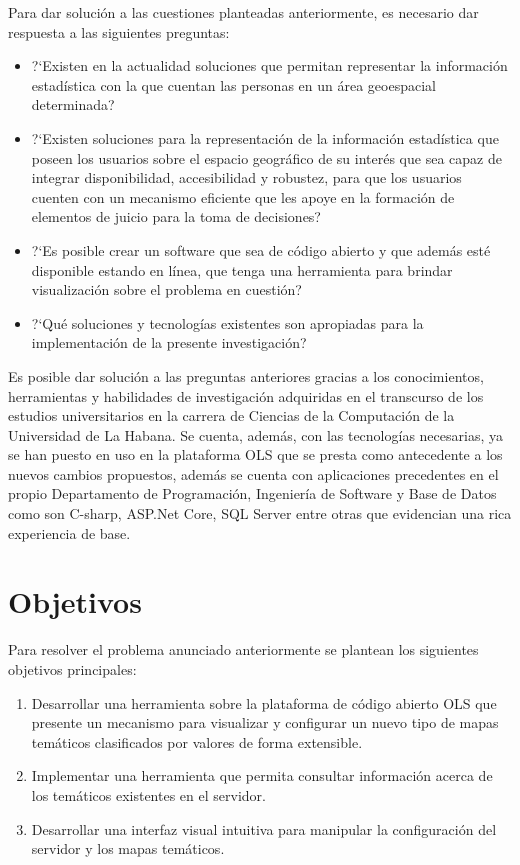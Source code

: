 Para dar soluci\'on a las cuestiones planteadas anteriormente, es necesario dar respuesta a las siguientes preguntas:

\begin{itemize}
\item ?`Existen en la actualidad soluciones que permitan representar la informaci\'on estad\'istica con la que cuentan las personas en un \'area geoespacial determinada?
\item ?`Existen soluciones para la representaci\'on de la informaci\'on estad\'istica que poseen los usuarios sobre el espacio geogr\'afico de su inter\'es que sea capaz de integrar disponibilidad, accesibilidad y robustez, para que los usuarios cuenten
con un mecanismo eficiente que les apoye en la formaci\'on de elementos de juicio para la toma de decisiones?
\item ?`Es posible crear un software que sea de c\'odigo abierto y que adem\'as est\'e disponible estando en l\'inea, que tenga una herramienta para brindar visualizaci\'on sobre el problema en cuesti\'on?
\item ?`Qu\'e soluciones y tecnolog\'ias existentes son apropiadas para la implementaci\'on de la presente investigaci\'on?
\end{itemize}

Es posible dar soluci\'on a las preguntas anteriores gracias a los conocimientos, herramientas y habilidades de investigaci\'on adquiridas en el transcurso de los estudios universitarios en la carrera de Ciencias de la Computaci\'on de la Universidad de La Habana. Se cuenta, adem\'as, con las tecnolog\'ias necesarias, ya se han puesto en uso en la plataforma OLS que se presta como antecedente a los nuevos cambios propuestos, adem\'as se cuenta con aplicaciones precedentes en el propio Departamento de Programaci\'on, Ingenier\'ia de Software y Base de Datos como son C-sharp, ASP.Net Core, SQL Server entre otras que evidencian una rica experiencia de base.\\


\section{Objetivos}
Para resolver el problema anunciado anteriormente se plantean los siguientes objetivos principales:

\begin{enumerate}
\item Desarrollar una herramienta sobre la plataforma de c\'odigo abierto OLS que presente un mecanismo para visualizar y configurar un nuevo tipo de mapas tem\'aticos clasificados por valores de forma extensible.
\item Implementar una herramienta que permita consultar informaci\'on acerca de los tem\'aticos existentes en el servidor.
\item Desarrollar una interfaz visual intuitiva para manipular la configuraci\'on del servidor y los mapas tem\'aticos.
\end{enumerate}

